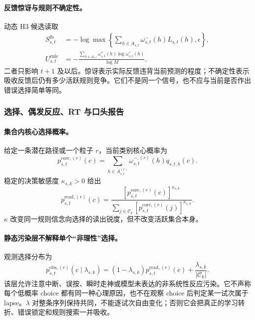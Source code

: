 \paragraph{反馈惊讶与规则不确定性。}
动态 H3 候选读取
\begin{align}
    S^{\mathrm{fb}}_{s,t}
    &=-\log\max\left\{
      \sum_{h\in A_{s,t}}
      \omega^-_{s,t}(h)L_{s,t}(h),\epsilon
      \right\},\\
    U^{\mathrm{rule}}_{s,t}
    &=-\frac{\sum_{h\in A_{s,t}}
      \omega^+_{s,t}(h)\log\omega^+_{s,t}(h)}{\log M}.
    \label{eq:model0805-surprise-uncertainty}
\end{align}
二者只影响 $t+1$ 及以后。惊讶表示实际反馈违背当前预测的程度；不确定性表示吸收反馈后仍有多少活跃规则竞争。它们不是同一个信号，也不应与当前是否作出错误选择简单等同。


\subsubsection{选择、偶发反应、RT 与口头报告}

\paragraph{集合内核心选择概率。}
给定一条潜在路径或一个粒子 $r$，当前类别核心概率为
\begin{equation}
    p^{\mathrm{core},(r)}_{s,t}(c)
    =\sum_{h\in A^{(r)}_{s,t}}
      \omega^{-,(r)}_{s,t}(h)q_{s,t,h}(c).
    \label{eq:model0805-core-choice}
\end{equation}
稳定的决策敏感度 $\kappa_{s,k}>0$ 给出
\begin{equation}
    p^{\mathrm{read},(r)}_{s,t}(c)
    =\frac{[p^{\mathrm{core},(r)}_{s,t}(c)]^{\kappa_{s,k}}}
    {\sum_{j\in\mathcal C_k}
     [p^{\mathrm{core},(r)}_{s,t}(j)]^{\kappa_{s,k}}}.
    \label{eq:model0805-choice-readout}
\end{equation}
$\kappa$ 改变同一规则信念向选择的读出锐度，但不改变活跃集合本身。

\paragraph{静态污染层不解释单个“非理性”选择。}
观测选择分布为
\begin{equation}
    p^{\mathrm{obs},(r)}_{s,t}(c\mid\lambda_{s,k})
    =(1-\lambda_{s,k})p^{\mathrm{read},(r)}_{s,t}(c)
      +\frac{\lambda_{s,k}}{|\mathcal C_k|}.
    \label{eq:model0805-lapse}
\end{equation}
该层允许注意中断、误按、瞬时走神或模型未表达的非系统性反应污染。它不声称每个低概率 choice 都有同一种心理原因，也不在观察 choice 后判定某一试次属于 lapse。$\lambda$ 对整条序列保持共同，不能逐试次自由变化；否则它会把真正的学习转折、错误锁定和规则搜索一并吸收。

